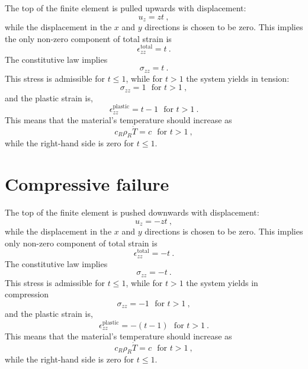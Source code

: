 The top of the finite element is pulled upwards with displacement:
\begin{equation}
u_{z} = zt \ ,
\end{equation}
while the displacement in the $x$ and $y$ directions is chosen to be
zero.  This implies the only non-zero component of total strain is
\begin{equation}
\epsilon^{\mathrm{total}}_{zz} = t \ .
\end{equation}
The constitutive law implies
\begin{equation}
\sigma_{zz} = t \ .
\end{equation}
This stress is admissible for $t\leq 1$, while for $t>1$ the system
yields in tension:
\begin{equation}
\sigma_{zz} = 1 \ \ \ \mbox{for } t>1 \ ,
\end{equation}
and the plastic strain is,
\begin{equation}
\epsilon^{\mathrm{plastic}}_{zz} = t - 1 \ \ \ \mbox{for } t>1 \ .
\end{equation}
This means that the material's temperature should increase as
\begin{equation}
c_{R}\rho_{R}\dot{T} = c \ \ \ \mbox{for } t>1 \ ,
\end{equation}
while the right-hand side is zero for $t\leq 1$.

\section{Compressive failure}

The top of the finite element is pushed downwards with displacement:
\begin{equation}
u_{z} = -zt \ ,
\end{equation}
while the displacement in the $x$ and $y$ directions is chosen to be
zero.  This implies only non-zero component of total strain is
\begin{equation}
\epsilon^{\mathrm{total}}_{zz} = -t \ .
\end{equation}
The constitutive law implies
\begin{equation}
\sigma_{zz} = -t \ .
\end{equation}
This stress is admissible for $t\leq 1$, while for $t>1$ the system
yields in compression
\begin{equation}
\sigma_{zz} = -1 \ \ \ \mbox{for } t>1 \ ,
\end{equation}
and the plastic strain is,
\begin{equation}
\epsilon^{\mathrm{plastic}}_{zz} = -(t - 1) \ \ \ \mbox{for } t>1 \ .
\end{equation}
This means that the material's temperature should increase as
\begin{equation}
c_{R}\rho_{R}\dot{T} = c \ \ \ \mbox{for } t>1 \ ,
\end{equation}
while the right-hand side is zero for $t\leq 1$.

